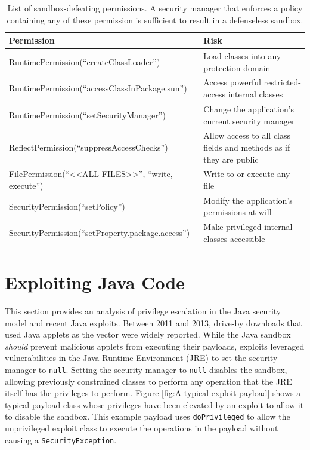 \documentclass{sig-alternate}
\begin{document}
\begin{table}
\caption{List of sandbox-defeating permissions. A security manager that enforces
a policy containing any of these permission is sufficient to result
in a defenseless sandbox.}
\label{tab:defenseless-permissions}


\centering{}%
\begin{tabular}{ll}
\toprule 
\textbf{Permission} & \textbf{Risk}\tabularnewline
\midrule
RuntimePermission(``createClassLoader'') & Load classes into any protection domain\tabularnewline
RuntimePermission(``accessClassInPackage.sun'') & Access powerful restricted-access internal classes\tabularnewline
RuntimePermission(``setSecurityManager'') & Change the application's current security manager\tabularnewline
ReflectPermission(``suppressAccessChecks'') & Allow access to all class fields and methods as if they are public\tabularnewline
FilePermission(``<\textcompwordmark{}<ALL FILES>\textcompwordmark{}>'',
``write, execute'') & Write to or execute any file\tabularnewline
SecurityPermission(``setPolicy'') & Modify the application's permissions at will\tabularnewline
SecurityPermission(``setProperty.package.access'') & Make privileged internal classes accessible\tabularnewline
\bottomrule
\end{tabular}
\end{table}



\section{Exploiting Java Code} \label{sub:Java-Exploits}

This section provides an analysis of privilege escalation in the Java
security model and recent Java exploits. Between 2011 and 2013, drive-by
downloads that used Java applets as the vector were widely reported.
While the Java sandbox \textit{should} prevent malicious applets from
executing their payloads, exploits leveraged vulnerabilities in the
Java Runtime Environment (JRE) to set the security manager to \texttt{null}.
Setting the security manager to \texttt{null} disables the sandbox,
allowing previously constrained classes to perform any operation that
the JRE itself has the privileges to perform. Figure \ref{fig:A-typical-exploit-payload}
shows a typical payload class whose privileges have been elevated
by an exploit to allow it to disable the sandbox. This example payload
uses \texttt{doPrivileged} to allow the unprivileged exploit class
to execute the operations in the payload without causing a \texttt{SecurityException}.
\end{document}
